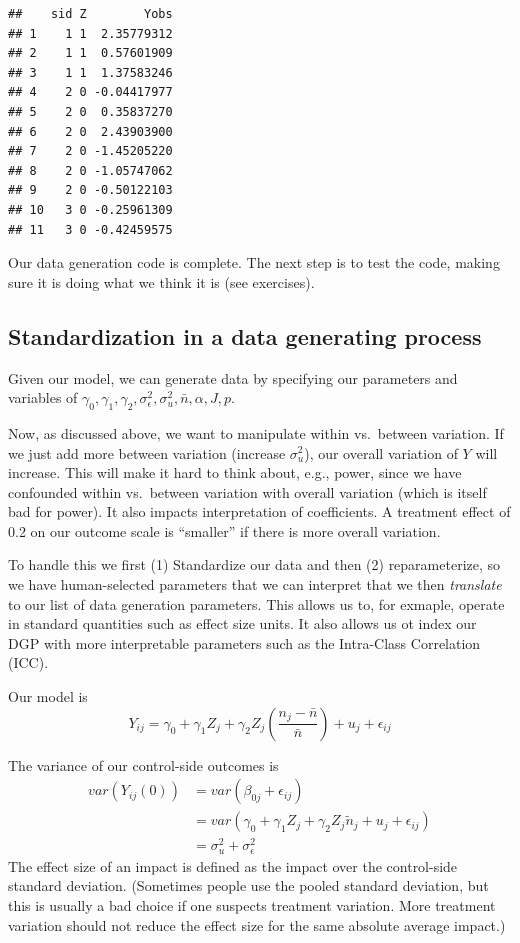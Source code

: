 \documentclass[
]{book}
\begin{document}
\begin{verbatim}
##    sid Z        Yobs
## 1    1 1  2.35779312
## 2    1 1  0.57601909
## 3    1 1  1.37583246
## 4    2 0 -0.04417977
## 5    2 0  0.35837270
## 6    2 0  2.43903900
## 7    2 0 -1.45205220
## 8    2 0 -1.05747062
## 9    2 0 -0.50122103
## 10   3 0 -0.25961309
## 11   3 0 -0.42459575
\end{verbatim}

Our data generation code is complete.
The next step is to test the code, making sure it is doing what we think it is (see exercises).

\hypertarget{standardization-in-a-data-generating-process}{%
\subsection{Standardization in a data generating process}\label{standardization-in-a-data-generating-process}}

Given our model, we can generate data by specifying our parameters and variables of \(\gamma_{0}, \gamma_{1}, \gamma_{2}, \sigma^2_\epsilon, \sigma^2_u, \bar{n}, \alpha, J, p\).

Now, as discussed above, we want to manipulate within vs.~between variation. If we just add more between variation (increase \(\sigma^2_u\)), our overall variation of \(Y\) will increase.
This will make it hard to think about, e.g., power, since we have confounded within vs.~between variation with overall variation (which is itself bad for power).
It also impacts interpretation of coefficients. A treatment effect of 0.2 on our outcome scale is ``smaller'' if there is more overall variation.

To handle this we first (1) Standardize our data and then (2) reparameterize, so we have human-selected parameters that we can interpret that we then \emph{translate} to our list of data generation parameters.
This allows us to, for exmaple, operate in standard quantities such as effect size units.
It also allows us ot index our DGP with more interpretable parameters such as the Intra-Class Correlation (ICC).

Our model is
\[ Y_{ij} = \gamma_{0} + \gamma_{1} Z_j + \gamma_2 Z_j \left(\frac{n_j - \bar{n}}{\bar{n}} \right)  + u_j + \epsilon_{ij}  \]

The variance of our control-side outcomes is
\[ 
\begin{aligned}
var( Y_{ij}(0) ) &= var( \beta_{0j} + \epsilon_{ij} ) \\
 &= var( \gamma_{0} + \gamma_{1} Z_j + \gamma_{2}Z_j \tilde{n}_j + u_j + \epsilon_{ij} ) \\
&= \sigma^2_u + \sigma^2_\epsilon
\end{aligned}
\]
The effect size of an impact is defined as the impact over the control-side standard deviation.
(Sometimes people use the pooled standard deviation, but this is usually a bad choice if one suspects treatment variation. More treatment variation should not reduce the effect size for the same absolute average impact.)
\end{document}
